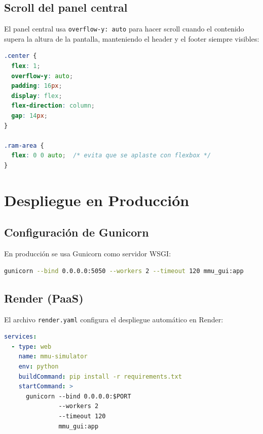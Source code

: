 \documentclass[12pt,a4paper]{article}
\begin{document}
\subsection{Scroll del panel central}

El panel central usa \texttt{overflow-y: auto} para hacer scroll cuando el contenido
supera la altura de la pantalla, manteniendo el header y el footer siempre visibles:

\begin{lstlisting}[language=css, caption=CSS para scroll del panel central]
.center {
  flex: 1;
  overflow-y: auto;
  padding: 16px;
  display: flex;
  flex-direction: column;
  gap: 14px;
}

.ram-area {
  flex: 0 0 auto;  /* evita que se aplaste con flexbox */
}
\end{lstlisting}

\newpage

\section{Despliegue en Producción}

\subsection{Configuración de Gunicorn}

En producción se usa Gunicorn como servidor WSGI:

\begin{lstlisting}[language=bash, caption=Comando de inicio en producción]
gunicorn --bind 0.0.0.0:5050 --workers 2 --timeout 120 mmu_gui:app
\end{lstlisting}

\subsection{Render (PaaS)}

El archivo \texttt{render.yaml} configura el despliegue automático en Render:

\begin{lstlisting}[language=yaml, caption=Configuración render.yaml]
services:
  - type: web
    name: mmu-simulator
    env: python
    buildCommand: pip install -r requirements.txt
    startCommand: >
      gunicorn --bind 0.0.0.0:$PORT
               --workers 2
               --timeout 120
               mmu_gui:app
\end{lstlisting}
\end{document}
